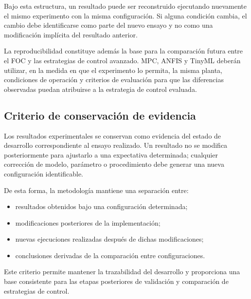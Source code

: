 Bajo esta estructura, un resultado puede ser reconstruido ejecutando nuevamente el mismo experimento con la misma configuración. Si alguna condición cambia, el cambio debe identificarse como parte del nuevo ensayo y no como una modificación implícita del resultado anterior.

La reproducibilidad constituye además la base para la comparación futura entre el FOC y las estrategias de control avanzado. MPC, ANFIS y TinyML deberán utilizar, en la medida en que el experimento lo permita, la misma planta, condiciones de operación y criterios de evaluación para que las diferencias observadas puedan atribuirse a la estrategia de control evaluada.

\subsection{Criterio de conservación de evidencia}

Los resultados experimentales se conservan como evidencia del estado de desarrollo correspondiente al ensayo realizado. Un resultado no se modifica posteriormente para ajustarlo a una expectativa determinada; cualquier corrección de modelo, parámetro o procedimiento debe generar una nueva configuración identificable.

De esta forma, la metodología mantiene una separación entre:

\begin{itemize}
\item resultados obtenidos bajo una configuración determinada;
\item modificaciones posteriores de la implementación;
\item nuevas ejecuciones realizadas después de dichas modificaciones;
\item conclusiones derivadas de la comparación entre configuraciones.
\end{itemize}

Este criterio permite mantener la trazabilidad del desarrollo y proporciona una base consistente para las etapas posteriores de validación y comparación de estrategias de control.

